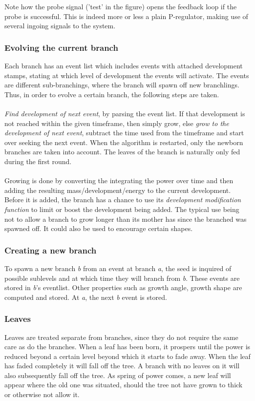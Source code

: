 Note how the probe signal ('test' in the figure) opens the feedback loop if the
probe is successful. This is indeed more or less a plain P-regulator, making use
of several ingoing signals to the system.
 
\subsubsection{Evolving the current branch}
Each branch has an event list which includes events with attached development
stamps, stating at which level of development the events will activate. The
events are different sub-branchings, where the branch will spawn off new
branchlings. Thus, in order to evolve a certain branch, the following steps
are taken.
\\\\
\emph{Find development of next event}, by parsing the event list. If that
development is not reached within the given timeframe, then simply grow, else
\emph{grow to the development of next event}, subtract the time used from the
timeframe and start over seeking the next event. When the algorithm is
restarted, only the newborn branches are taken into account. The leaves of the
branch is naturally only fed during the first round. 
\\\\
Growing is done by
converting the integrating the power over time and then adding the resulting
mass/development/energy to the current development. Before it is added, the
branch has a chance to use its \emph{development modification function} to
limit or boost the development being added. The typical use being
not to allow a branch to grow longer than its mother has since the
branched was spawned off. It could also be used to encourage certain shapes.

                       
\subsubsection{Creating a new branch}
To spawn a new branch \emph{b} from an event at branch \emph{a}, the seed is inquired of possible
sublevels and at which time they will branch from \emph{b}. These events are
stored in \emph{b}'s eventlist. Other properties such as growth angle, growth
shape are computed and stored. At \emph{a}, the next \emph{b} event is stored.
\subsubsection{Leaves}
Leaves are treated separate from branches, since they do not require the same
care as do the branches. When a leaf has been born, it prospers until the
power is reduced beyond a certain level beyond which it starts to fade away.
When the leaf has faded completely it will fall off the tree. A branch with no
leaves on it will also subsequently fall off the tree. As spring of power
comes, a new leaf will appear where the old one was situated, should the tree
not have grown to thick or otherwise not allow it.

